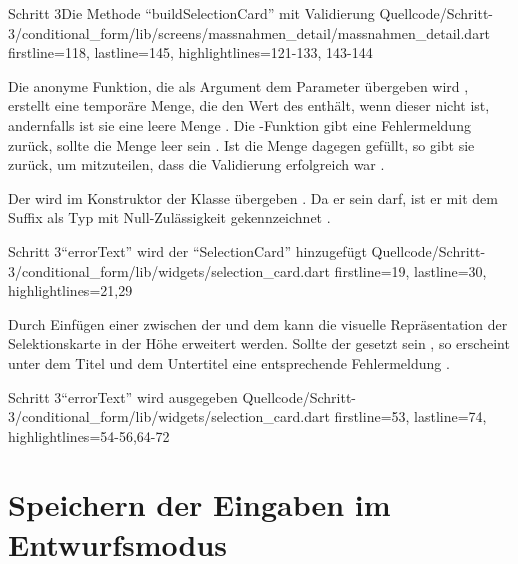 \begin{alexlisting}{Schritt 3}{Die Methode \enquote{buildSelectionCard} mit Validierung}
    {Quellcode/Schritt-3/conditional_form/lib/screens/massnahmen_detail/massnahmen_detail.dart}
    {firstline=118, lastline=145, highlightlines={121-133, 143-144}}
    \label{lst:Schritt3buildSelectionCardValidator}
\end{alexlisting}

Die anonyme Funktion, die als Argument dem Parameter  übergeben wird , erstellt eine temporäre Menge, die den Wert des  enthält, wenn dieser nicht  ist, andernfalls ist sie eine leere Menge .
Die -Funktion gibt eine Fehlermeldung zurück, sollte die Menge leer sein .
Ist die Menge dagegen gefüllt, so gibt sie  zurück, um mitzuteilen, dass die Validierung erfolgreich war .



Der  wird im Konstruktor der Klasse  übergeben .
Da er  sein darf, ist er mit dem Suffix  als Typ mit Null-Zulässigkeit gekennzeichnet .

\begin{alexlisting}{Schritt 3}{\enquote{errorText} wird der \enquote{SelectionCard} hinzugefügt}
    {Quellcode/Schritt-3/conditional_form/lib/widgets/selection_card.dart}
    {firstline=19, lastline=30, highlightlines={21,29}}
    \label{lst:Schritt3errorText}
\end{alexlisting}

Durch Einfügen einer  zwischen der   und dem   kann die visuelle Repräsentation der Selektionskarte in der Höhe erweitert werden.
Sollte der  gesetzt sein , so erscheint unter dem Titel und dem Untertitel eine entsprechende Fehlermeldung .
 

\begin{alexlisting}{Schritt 3}{\enquote{errorText} wird ausgegeben}
    {Quellcode/Schritt-3/conditional_form/lib/widgets/selection_card.dart}
    {firstline=53, lastline=74, highlightlines={54-56,64-72}}
    \label{lst:Schritt3ColumnErrorText}
\end{alexlisting}

\section{Speichern der Eingaben im Entwurfsmodus}


